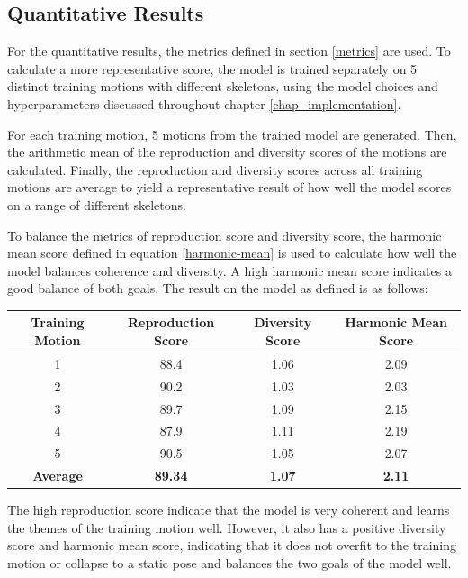 \documentclass[a4paper, 12pt]{report}
\begin{document}
\subsection{Quantitative Results}
For the quantitative results, the metrics defined in section \ref{metrics} are used. To calculate a more representative score, the model is trained separately on 5 distinct training motions with different skeletons, using the model choices and hyperparameters discussed throughout chapter \ref{chap_implementation}.

For each training motion, 5 motions from the trained model are generated. Then, the arithmetic mean of the reproduction and diversity scores of the motions are calculated. Finally, the reproduction and diversity scores across all training motions are average to yield a representative result of how well the model scores on a range of different skeletons.

To balance the metrics of reproduction score and diversity score, the harmonic mean score defined in equation \ref{harmonic-mean} is used to calculate how well the model balances coherence and diversity. A high harmonic mean score indicates a good balance of both goals. The result on the model as defined is as follows:

\begin{table}[H]
	\centering
	\begin{tabular}{||c c c c||} 
		\hline
		Training Motion  & Reproduction Score & Diversity Score & Harmonic Mean Score \\ [0.5ex] 
		\hline\hline
		1                & 88.4               & 1.06            & 2.09                \\ 
		2                & 90.2               & 1.03            & 2.03                \\
		3                & 89.7               & 1.09            & 2.15                \\
		4                & 87.9               & 1.11            & 2.19                \\
		5                & 90.5               & 1.05            & 2.07                \\
		\textbf{Average} & \textbf{89.34}     & \textbf{1.07}   & \textbf{2.11}       \\[1ex] 
		\hline
	\end{tabular}
\end{table}

The high reproduction score indicate that the model is very coherent and learns the themes of the training motion well. However, it also has a positive diversity score and harmonic mean score, indicating that it does not overfit to the training motion or collapse to a static pose and balances the two goals of the model well. 
\end{document}
